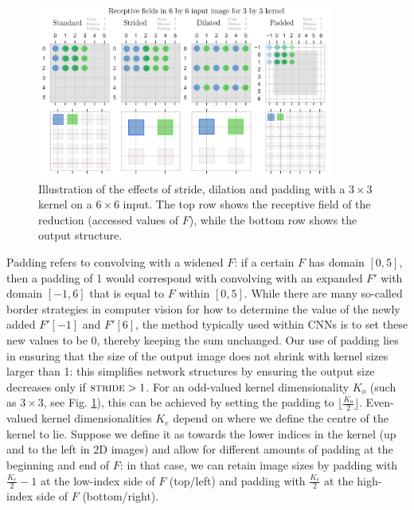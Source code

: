 \documentclass[a4paper, 12pt]{report}
\begin{document}
\begin{figure}[h!]
	\center
  \includegraphics[width=0.87\textwidth]{figures/stride-dilation-padding.png}
  \caption{Illustration of the effects of stride, dilation and padding with a $3\times3$ kernel on a $6\times6$ input. The top row shows the receptive field of the reduction (accessed values of $F$), while the bottom row shows the output structure.}
  \label{fig:stride-dilation-padding}
\end{figure}

\noindent
Padding refers to convolving with a widened $F$: if a certain $F$ has domain $[0, 5]$, then a padding of 1 would correspond with convolving with an expanded $F'$ with domain $[-1, 6]$ that is equal to $F$ within $[0, 5]$. While there are many so-called border strategies \cite{gonzalez2017} in computer vision for how to determine the value of the newly added $F'[-1]$ and $F'[6]$, the method typically used within CNNs is to set these new values to be 0, thereby keeping the sum unchanged. 
Our use of padding lies in ensuring that the size of the output image does not shrink with kernel sizes larger than 1: this simplifies network structures by ensuring the output size decreases only if $\textsc{stride}>1$. For an odd-valued kernel dimensionality $K_o$ (such as $3\times3$, see Fig. \ref{fig:stride-dilation-padding}), this can be achieved by setting the padding to $\lfloor\frac{K_o}{2}\rfloor$. Even-valued kernel dimensionalities $K_e$ depend on where we define the centre of the kernel to lie. Suppose we define it as towards the lower indices in the kernel (up and to the left in 2D images) and allow for different amounts of padding at the beginning and end of $F$: in that case, we can retain image sizes by padding with $\frac{K_e}{2}-1$ at the low-index side of $F$ (top/left) and padding with $\frac{K_e}{2}$ at the high-index side of $F$ (bottom/right).
\end{document}
